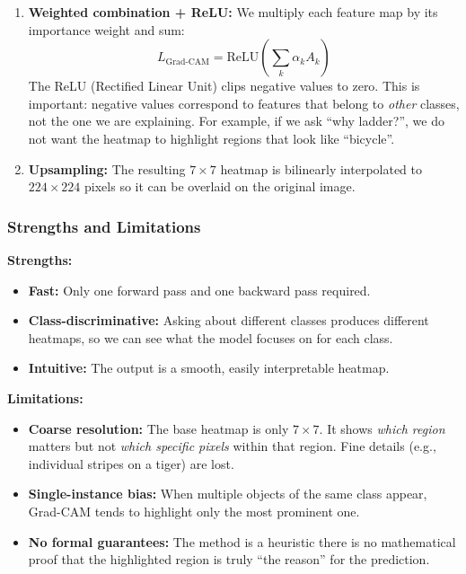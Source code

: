 \documentclass[12pt, a4paper]{article}
\begin{document}
\begin{enumerate}[leftmargin=*]
    \item \textbf{Weighted combination + ReLU:} We multiply each feature map
          by its importance weight and sum:
          \begin{equation}
          L_{\text{Grad-CAM}} = \text{ReLU}\left(\sum_k \alpha_k A_k\right)
          \end{equation}
          The ReLU (Rectified Linear Unit) clips negative values to zero.
          This is important: negative values correspond to features that
          belong to \emph{other} classes, not the one we are explaining.
          For example, if we ask ``why ladder?'', we do not want the
          heatmap to highlight regions that look like ``bicycle''.

    \item \textbf{Upsampling:} The resulting $7 \times 7$ heatmap is bilinearly
          interpolated to $224 \times 224$ pixels so it can be overlaid on the
          original image.
\end{enumerate}

\subsubsection{Strengths and Limitations}

\textbf{Strengths:}
\begin{itemize}[leftmargin=*]
    \item \textbf{Fast:} Only one forward pass and one backward pass required.
    \item \textbf{Class-discriminative:} Asking about different classes produces
          different heatmaps, so we can see what the model focuses on for each
          class.
    \item \textbf{Intuitive:} The output is a smooth, easily interpretable
          heatmap.
\end{itemize}

\textbf{Limitations:}
\begin{itemize}[leftmargin=*]
    \item \textbf{Coarse resolution:} The base heatmap is only $7 \times 7$.
          It shows \emph{which region} matters but not \emph{which specific
          pixels} within that region.  Fine details (e.g., individual stripes
          on a tiger) are lost.
    \item \textbf{Single-instance bias:} When multiple objects of the same
          class appear, Grad-CAM tends to highlight only the most prominent
          one.
    \item \textbf{No formal guarantees:} The method is a heuristic there
          is no mathematical proof that the highlighted region is truly
          ``the reason'' for the prediction.
\end{itemize}
\end{document}

